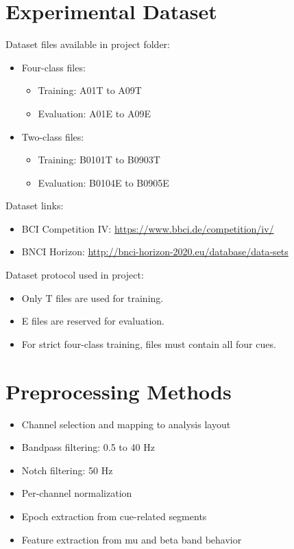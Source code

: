\documentclass[12pt,a4paper]{article}
\begin{document}
\section{Experimental Dataset}
Dataset files available in project folder:
\begin{itemize}[leftmargin=1.5em]
  \item Four-class files:
  \begin{itemize}[leftmargin=1.5em]
    \item Training: A01T to A09T
    \item Evaluation: A01E to A09E
  \end{itemize}
  \item Two-class files:
  \begin{itemize}[leftmargin=1.5em]
    \item Training: B0101T to B0903T
    \item Evaluation: B0104E to B0905E
  \end{itemize}
\end{itemize}

Dataset links:
\begin{itemize}[leftmargin=1.5em]
  \item BCI Competition IV: \url{https://www.bbci.de/competition/iv/}
  \item BNCI Horizon: \url{http://bnci-horizon-2020.eu/database/data-sets}
\end{itemize}

Dataset protocol used in project:
\begin{itemize}[leftmargin=1.5em]
  \item Only T files are used for training.
  \item E files are reserved for evaluation.
  \item For strict four-class training, files must contain all four cues.
\end{itemize}

\section{Preprocessing Methods}
\begin{itemize}[leftmargin=1.5em]
  \item Channel selection and mapping to analysis layout
  \item Bandpass filtering: 0.5 to 40 Hz
  \item Notch filtering: 50 Hz
  \item Per-channel normalization
  \item Epoch extraction from cue-related segments
  \item Feature extraction from mu and beta band behavior
\end{itemize}
\end{document}
